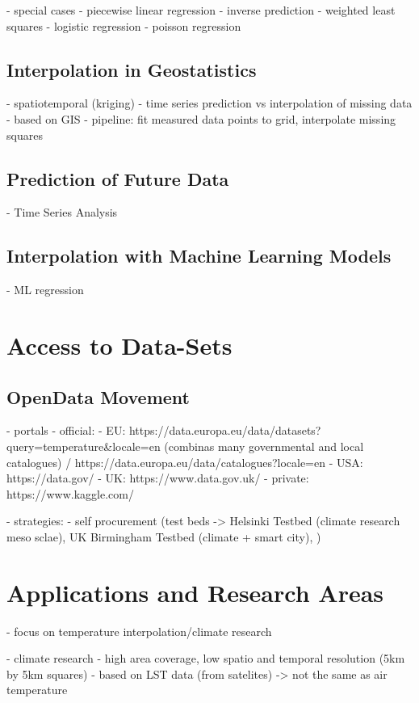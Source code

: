 - special cases
    - piecewise linear regression
    - inverse prediction
    - weighted least squares
    - logistic regression
    - poisson regression

\subsection{Interpolation in Geostatistics}

- spatiotemporal (kriging)
- time series prediction vs interpolation of missing data
- based on GIS 
- pipeline: fit measured data points to grid, interpolate missing squares


\subsection{Prediction of Future Data}
- Time Series Analysis

\subsection{Interpolation with Machine Learning Models}

- ML regression

\section{Access to Data-Sets}

\subsection{OpenData Movement}
 - portals
        - official:
            - EU: https://data.europa.eu/data/datasets?query=temperature\&locale=en (combinas many governmental and local catalogues) / https://data.europa.eu/data/catalogues?locale=en
            - USA: https://data.gov/
            - UK: https://www.data.gov.uk/
        - private: https://www.kaggle.com/

- strategies:
    - self procurement (test beds -> Helsinki Testbed (climate research meso sclae), UK Birmingham Testbed (climate + smart city), )

\section{Applications and Research Areas}

- focus on temperature interpolation/climate research

- climate research
    - high area coverage, low spatio and temporal resolution (5km by 5km squares)
    - based on LST data (from satelites) -> not the same as air temperature

